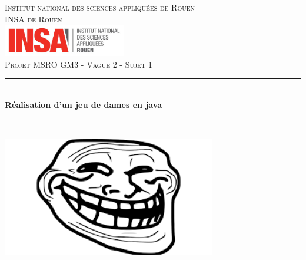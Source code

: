 \documentclass[12,french]{report}
\newcommand{\HRule}{\rule{\linewidth}{0.5mm}}
\begin{document}
\hypersetup{pdfborder=0 0 0}

\begin{titlepage}

\begin{center}
	\textsc{{\LARGE Institut national des sciences appliquées de Rouen} \\ 			\vspace{6mm} {\Large INSA de Rouen}} \\
	\vspace{5mm}
	\includegraphics[width=0.4\textwidth]{./Images/insa}\\[1.0 cm]

	\textsc{\Large Projet MSRO GM3 - Vague 2 - Sujet 1}\\[0.6cm]

	\HRule \\[0.5cm]
	{ \Huge \bfseries Réalisation d'un jeu de dames en java}\\[0.2cm]
	\HRule \\[0.75cm]

	\includegraphics[width=0.7\textwidth]{./Images/Page_de_garde}\\[0.9 cm]


\end{center}
\end{titlepage}
\end{document}
